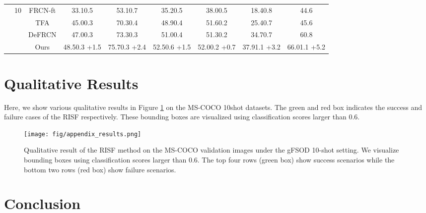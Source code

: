 \documentclass{article}
\begin{document}
\begin{table}[hbt!]
\begin{adjustbox}{width=0.79\textwidth}
{\begin{tabular}{c|c|c|ccc|c|cc}
         \cmidrule{2-9}
         &\multirow{5}{*}{10}&FRCN-ft \cite{metarcnn}&33.10.5&53.10.7&35.20.5&38.00.5&18.40.8&44.6\\
         &&TFA \cite{tfa}&45.00.3&70.30.4&48.90.4&51.60.2&25.40.7&45.6\\
         &&DeFRCN \cite{defrcn}&47.00.3&73.30.3&51.00.4&51.30.2&34.70.7&60.8\\
         && \cellcolor{gray!30}Ours&\cellcolor{gray!30}48.50.3 {\scriptsize \color{red}+1.5}&\cellcolor{gray!30}75.70.3 {\scriptsize \color{red}+2.4}&\cellcolor{gray!30}52.50.6 {\scriptsize \color{red}+1.5}&\cellcolor{gray!30}52.00.2 {\scriptsize \color{red}+0.7}&\cellcolor{gray!30}37.91.1 {\scriptsize \color{red}+3.2}&\cellcolor{gray!30}66.01.1 {\scriptsize \color{red}+5.2}\\
         \midrule
    \end{tabular}
    }
    \end{adjustbox}

    \label{tab:gfsod}
\end{table}
\section{Qualitative Results}

Here, we show various qualitative results in Figure  \ref{fig:qualitative} on the MS-COCO 10shot datasets.
The green and red box indicates the success and failure cases of the RISF respectively.
These bounding boxes are visualized using classification scores larger than 0.6.





\begin{figure}[hbt!]
    \centering
    \texttt{[image: fig/appendix\_results.png]}
    \caption{Qualitative result of the RISF method on the MS-COCO validation images under the gFSOD 10-shot setting. 
    We visualize bounding boxes using classification scores larger than 0.6.
    The top four rows (green box) show success scenarios while the bottom two rows (red box) show failure scenarios.
    }
    \label{fig:qualitative}
\end{figure}



\section{Conclusion}
\end{document}
